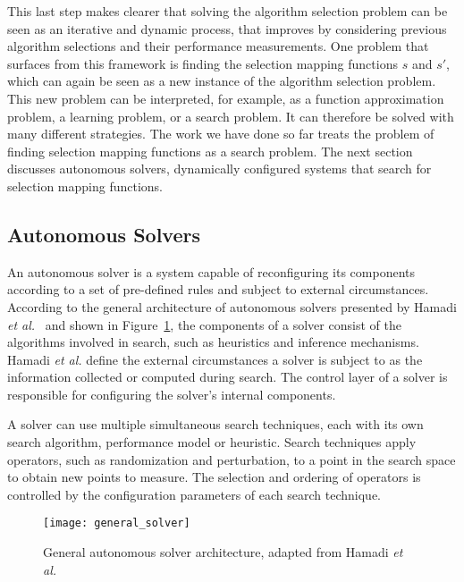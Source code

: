 This last step makes clearer that solving the algorithm selection problem can
be seen as an iterative and dynamic process, that improves by considering
previous algorithm selections and their performance measurements. One problem
that surfaces from this framework is finding the selection mapping functions
$s$ and $s'$, which can again be seen as a new instance of the algorithm
selection problem. This new problem can be interpreted, for example, as a
function approximation problem, a learning problem, or a search problem.
It can therefore be solved with many different strategies.
The work we have done so far treats the problem of finding selection mapping
functions as a search problem. The next section discusses autonomous
solvers, dynamically configured systems that search for selection mapping
functions.

\subsection{Autonomous Solvers}

An autonomous solver is a system capable of reconfiguring its components
according to a set of pre-defined rules and subject to external circumstances.
According to the general architecture of autonomous solvers presented by Hamadi
\emph{et al.}~\cite{hamadi2011autonomous, hamadi2012autonomous} and shown in
Figure~\ref{fig:general_solver}, the components of a solver consist of the
algorithms involved in search, such as heuristics and inference mechanisms.
Hamadi \emph{et al.} define the external circumstances a solver is subject to
as the information collected or computed during search.  The control layer of a
solver is responsible for configuring the solver's internal components.

A solver can use multiple simultaneous search techniques, each with its own
search algorithm, performance model or heuristic. Search techniques apply
operators, such as randomization and perturbation, to a point in the search
space to obtain new points to measure. The selection and ordering of operators
is controlled by the configuration parameters of each search technique.

\begin{figure}[htpb]
    \centering
    \texttt{[image: general\_solver]}
    \caption{General autonomous solver architecture, adapted from Hamadi \emph{et al.}~\cite{hamadi2012autonomous}}
    \label{fig:general_solver}
\end{figure}

